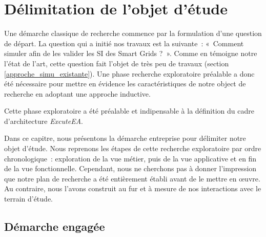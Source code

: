 \chapter{Délimitation de l'objet d'étude}
\label{ch:methodo}

\PartialToc


Une démarche classique de recherche commence par la formulation d'une question 
de départ. La question qui a initié nos travaux est la suivante~: «~Comment 
simuler afin de les valider les SI des Smart Grids ?~».  Comme en témoigne notre 
l'état de l'art, cette question fait l'objet de très peu de travaux (section 
\ref{approche_simu_existante}). Une phase recherche exploratoire préalable a donc été nécessaire 
pour mettre en évidence les caractéristiques de notre object de recherche en adoptant une approche inductive.

Cette phase exploratoire a été préalable et indipensable à la définition du cadre d'architecture 
\textit{ExcuteEA}. 


Dans ce capitre, nous présentons la démarche entreprise pour délimiter 
notre objet d'étude. Nous reprenons les étapes de cette recherche exploratoire 
par ordre chronologique~: exploration de la vue métier, puis de la vue 
applicative et en fin de la vue fonctionnelle. Cependant, 
nous ne cherchons pas à donner l'impression que notre plan de recherche a été 
entièrement établi avant de le mettre en œuvre. Au contraire, nous l'avons 
construit au fur et à mesure de nos interactions avec le terrain d'étude. 


\section{Démarche engagée}
		
